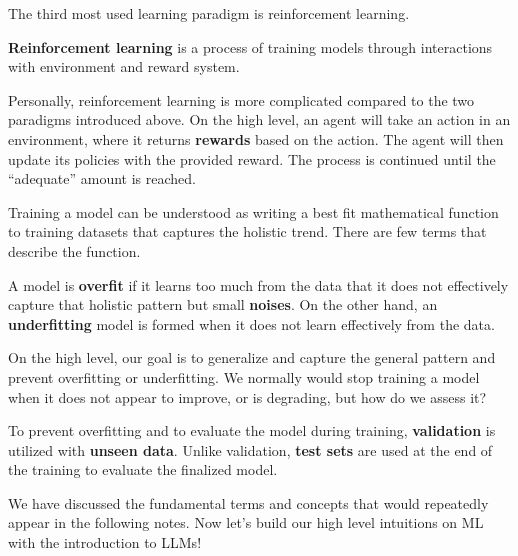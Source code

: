 \documentclass[../../main.tex]{subfiles}
\begin{document}
The third most used learning paradigm is reinforcement learning.

\begin{definition}{}{}
\textbf{Reinforcement learning} is a process of training models
through interactions with environment and reward system.
\end{definition}

Personally, reinforcement learning is more complicated compared to
the two paradigms introduced above. On the high level, an agent will
take an action in an environment, where it returns \textbf{rewards}
based on the action. The agent will then update its policies with
the provided reward. The process is continued until the ``adequate''
amount is reached.

Training a model can be understood as writing a best fit
mathematical function to training datasets that captures the
holistic trend. There are few terms that describe the function.

\begin{definition}{}{}
A model is \textbf{overfit} if it learns too much from the data
that it does not effectively capture that holistic pattern but
small \textbf{noises}. On the other hand, an \textbf{underfitting}
model is formed when it does not learn effectively from the data.
\end{definition}

On the high level, our goal is to generalize and capture the general
pattern and prevent overfitting or underfitting. We normally would
stop training a model when it does not appear to improve, or is
degrading, but how do we assess it?

\begin{definition}{}{}
To prevent overfitting and to evaluate the model during training,
\textbf{validation} is utilized with \textbf{unseen data}.
Unlike validation, \textbf{test sets} are used at the end of the
training to evaluate the finalized model.
\end{definition}

We have discussed the fundamental terms and concepts that would
repeatedly appear in the following notes. Now let's build our
high level intuitions on ML with the introduction to LLMs!
\end{document}
